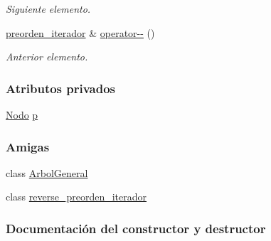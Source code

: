 \begin{DoxyCompactItemize}
\begin{DoxyCompactList}\small\item\em Siguiente elemento. \end{DoxyCompactList}\item 
\hyperlink{classArbolGeneral_1_1preorden__iterador}{preorden\+\_\+iterador} \& \hyperlink{classArbolGeneral_1_1preorden__iterador_a79952609e35dd16830356a19b404abba}{operator-\/-\/} ()
\begin{DoxyCompactList}\small\item\em Anterior elemento. \end{DoxyCompactList}\end{DoxyCompactItemize}
\subsubsection*{Atributos privados}
\begin{DoxyCompactItemize}
\item 
\hyperlink{classArbolGeneral_a12cc1b74a9095d89bc7334290d332f7a}{Nodo} \hyperlink{classArbolGeneral_1_1preorden__iterador_afac01ba5fdc1e10c2a808d92f1dbddaf}{p}
\end{DoxyCompactItemize}
\subsubsection*{Amigas}
\begin{DoxyCompactItemize}
\item 
class \hyperlink{classArbolGeneral_1_1preorden__iterador_a9c06e31b7c3e0d4ee5b03003d32935a5}{Arbol\+General}
\item 
class \hyperlink{classArbolGeneral_1_1preorden__iterador_ad7df6535fb84021c7c3804850af9fdcd}{reverse\+\_\+preorden\+\_\+iterador}
\end{DoxyCompactItemize}


\subsubsection{Documentación del constructor y destructor}
\hypertarget{classArbolGeneral_1_1preorden__iterador_a1ad7d0b716beb169de08516187b002e4}{}\label{classArbolGeneral_1_1preorden__iterador_a1ad7d0b716beb169de08516187b002e4} 
